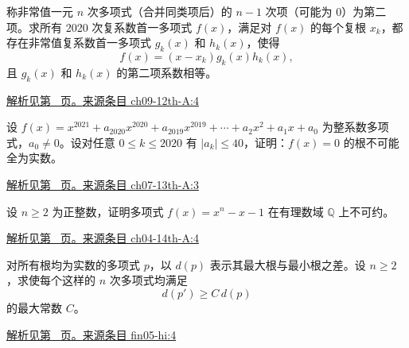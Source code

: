 \documentclass[12pt,fontset=fandol]{ctexart}
\begin{document}
\begin{example}\label{ex:ch09-12th-A:4}

称非常值一元 $n$ 次多项式（合并同类项后）的 $n-1$ 次项（可能为 0）为第二项。求所有 2020 次复系数首一多项式 $f(x)$，满足对 $f(x)$ 的每个复根 $x_{k}$，都存在非常值复系数首一多项式 $g_{k}(x)$ 和 $h_{k}(x)$，使得
\[
f(x)=\left(x-x_{k}\right)g_{k}(x)h_{k}(x),
\]
且 $g_{k}(x)$ 和 $h_{k}(x)$ 的第二项系数相等。

\par\hyperref[ans:ch09-12th-A:4]{解析见第~\pageref{ans:ch09-12th-A:4} 页。}\quad\href{https://github.com/lzxcr/cmc-mathematics/blob/64916fa1fdbc3e444a652eca204d5669058ee321/src/problems/preliminary/12/04.md}{来源条目 ch09-12th-A:4}

\end{example}

\begin{example}\label{ex:ch07-13th-A:3}

设 $f(x)=x^{2021}+a_{2020}x^{2020}+a_{2019}x^{2019}+\cdots+a_{2}x^{2}+a_{1}x+a_{0}$ 为整系数多项式，$a_{0}\neq 0$。设对任意 $0\leq k\leq 2020$ 有 $\left|a_{k}\right|\leq 40$，证明：$f(x)=0$ 的根不可能全为实数。

\par\hyperref[ans:ch07-13th-A:3]{解析见第~\pageref{ans:ch07-13th-A:3} 页。}\quad\href{https://github.com/lzxcr/cmc-mathematics/blob/64916fa1fdbc3e444a652eca204d5669058ee321/src/problems/preliminary/13/03.md}{来源条目 ch07-13th-A:3}

\end{example}

\begin{example}\label{ex:ch04-14th-A:4}

设 $n\geq 2$ 为正整数，证明多项式 $f(x)=x^{n}-x-1$ 在有理数域 $\mathbb{Q}$ 上不可约。

\par\hyperref[ans:ch04-14th-A:4]{解析见第~\pageref{ans:ch04-14th-A:4} 页。}\quad\href{https://github.com/lzxcr/cmc-mathematics/blob/64916fa1fdbc3e444a652eca204d5669058ee321/src/problems/preliminary/14/04.md}{来源条目 ch04-14th-A:4}

\end{example}

\begin{example}\label{ex:fin05-hi:4}

对所有根均为实数的多项式 $p$，以 $d(p)$ 表示其最大根与最小根之差。设 $n\ge2$，求使每个这样的 $n$ 次多项式均满足
\[
d(p')\ge C\,d(p)
\]
的最大常数 $C$。

\par\hyperref[ans:fin05-hi:4]{解析见第~\pageref{ans:fin05-hi:4} 页。}\quad\href{https://github.com/lzxcr/cmc-mathematics/blob/64916fa1fdbc3e444a652eca204d5669058ee321/src/problems/finals/05/04.md}{来源条目 fin05-hi:4}

\end{example}
\end{document}
